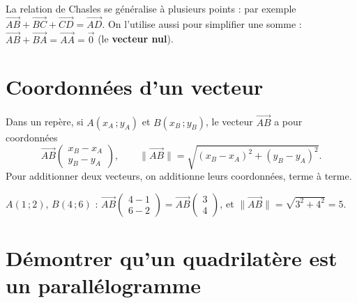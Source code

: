 \begin{remarque}
La relation de Chasles se généralise à plusieurs points : par exemple
$\vec{AB}+\vec{BC}+\vec{CD}=\vec{AD}$. On l'utilise aussi pour simplifier une somme :
$\vec{AB}+\vec{BA}=\vec{AA}=\vec 0$ (le \textbf{vecteur nul}).
\end{remarque}

\section{Coordonnées d'un vecteur}

\begin{propriete}
Dans un repère, si $A(x_A\,;y_A)$ et $B(x_B\,;y_B)$, le vecteur $\vec{AB}$ a pour
coordonnées
\[
\vec{AB}\begin{pmatrix}x_B-x_A\\y_B-y_A\end{pmatrix}, \qquad
\|\vec{AB}\|=\sqrt{(x_B-x_A)^{2}+(y_B-y_A)^{2}}.
\]
Pour additionner deux vecteurs, on additionne leurs coordonnées, terme à terme.
\end{propriete}

\begin{illus}
\end{illus}

\begin{exemple}
$A(1\,;2)$, $B(4\,;6)$ : $\vec{AB}\begin{pmatrix}4-1\\6-2\end{pmatrix}=\vec{AB}\begin{pmatrix}3\\4\end{pmatrix}$,
et $\|\vec{AB}\|=\sqrt{3^{2}+4^{2}}=5$.
\end{exemple}

\section{Démontrer qu'un quadrilatère est un parallélogramme}

